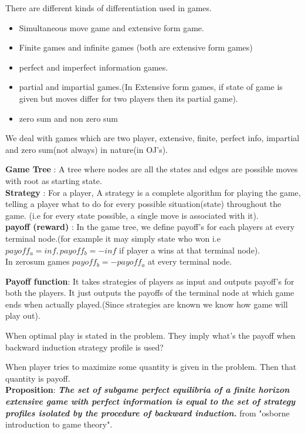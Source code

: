 \documentclass[../Notes.tex]{subfiles}
\begin{document}
There are different kinds of differentiation used in games.
\begin{itemize}
	\item Simultaneous move game and extensive form game.
	\item Finite games and infinite games (both are extensive form games)
	\item perfect and imperfect information games.
	\item partial and impartial games.(In Extensive form games, if state of game is given but moves differ for two players then its partial game).
	\item zero sum and non zero sum
\end{itemize}

We deal with games which are two player, extensive, finite, perfect info, impartial and zero sum(not always) in nature(in OJ's).
 
\textbf{Game Tree} : A tree where nodes are all the states and edges are possible moves with root as starting state.\\
\textbf{Strategy} : For a player, A strategy is a complete algorithm for playing the game, telling a player what to do for every possible situation(state) throughout the game. (i.e for every state possible, a single move is associated with it).\\
\textbf{payoff (reward)} : In the game tree, we define payoff's for each players at every terminal node.(for example it may simply state who won i.e $payoff_{a}=inf, payoff_{b}=-inf$ if player a wins at that terminal node).\\
In zerosum games $payoff_{b} = -payoff_{a}$ at every terminal node.

\textbf{Payoff function}: It takes strategies of players as input and outputs payoff's for both the players. It just outputs the payoffs of the terminal node at which game ends when actually played.(Since strategies are known we know how game will play out).

When optimal play is stated in the problem. They imply what's the payoff when backward induction strategy profile is used?

When player tries to maximize some quantity is given in the problem. Then that quantity is payoff.\\
\textbf{Proposition}:\textbf{ \textit{The set of subgame perfect equilibria of a finite horizon extensive game with perfect information is equal to the set of strategy profiles isolated by the procedure of backward induction.}} from "osborne introduction to game theory".
\pagebreak
\end{document}
